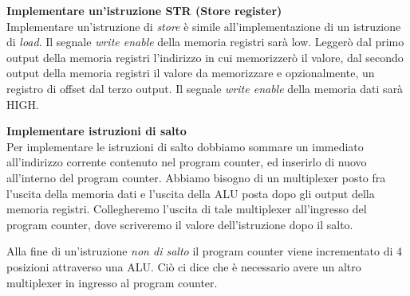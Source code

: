 \begin{defn}
\textbf{Implementare un'istruzione STR (Store register)} \\
Implementare un'istruzione di \textit{store} è simile all'implementazione di un istruzione di \textit{load}.
Il segnale \textit{write enable} della memoria registri sarà low. Leggerò dal primo output della memoria registri l'indirizzo in cui memorizzerò il valore,
dal secondo output della memoria registri il valore da memorizzare e opzionalmente, un registro di offset dal terzo output.
Il segnale \textit{write enable} della memoria dati sarà HIGH.
\end{defn}

\begin{defn}
\textbf{Implementare istruzioni di salto} \\
Per implementare le istruzioni di salto dobbiamo sommare un immediato
all'indirizzo corrente contenuto nel program counter, ed inserirlo di nuovo all'interno del program counter.
Abbiamo bisogno di un multiplexer posto fra l'uscita della memoria dati e l'uscita della ALU posta dopo gli output della memoria registri.
Collegheremo l'uscita di tale multiplexer all'ingresso del program counter, dove scriveremo il valore dell'istruzione dopo il salto.

Alla fine di un'istruzione \textit{non di salto} il program counter viene incrementato di 4 posizioni attraverso una ALU.
Ciò ci dice che è necessario avere un altro multiplexer in ingresso al program counter.
\end{defn}